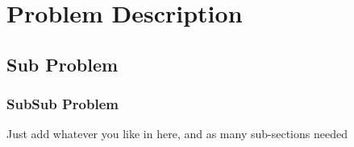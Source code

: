 \section{Problem Description}\label{sec:prob_descr}
\subsection{Sub Problem}\label{sec:sub_prob_descr}
\subsubsection{SubSub Problem}\label{sec:sub_sub_prob_descr}

Just add whatever you like in here, and as many sub-sections needed
